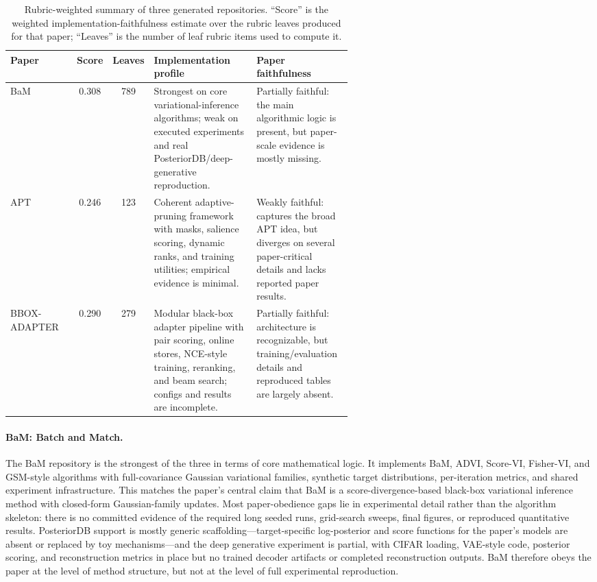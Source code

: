 \documentclass[11pt]{article}
\begin{document}
\begin{table}[t]
\centering
\small
\begin{tabular}{lcc p{0.30\linewidth} p{0.28\linewidth}}
\toprule
\textbf{Paper} & \textbf{Score} & \textbf{Leaves} &
\textbf{Implementation profile} & \textbf{Paper faithfulness} \\
\midrule
BaM & 0.308 & 789
& Strongest on core variational-inference algorithms; weak on
executed experiments and real PosteriorDB/deep-generative
reproduction.
& Partially faithful: the main algorithmic logic is present, but
paper-scale evidence is mostly missing. \\
APT & 0.246 & 123
& Coherent adaptive-pruning framework with masks, salience scoring,
dynamic ranks, and training utilities; empirical evidence is
minimal.
& Weakly faithful: captures the broad APT idea, but diverges on
several paper-critical details and lacks reported paper results. \\
BBOX-ADAPTER & 0.290 & 279
& Modular black-box adapter pipeline with pair scoring, online
stores, NCE-style training, reranking, and beam search; configs and
results are incomplete.
& Partially faithful: architecture is recognizable, but
training/evaluation details and reproduced tables are largely
absent. \\
\bottomrule
\end{tabular}
\caption{Rubric-weighted summary of three generated repositories.
``Score'' is the weighted implementation-faithfulness estimate over
the rubric leaves produced for that paper; ``Leaves'' is the number
of leaf rubric items used to compute it.}
\label{tab:three_repo_summary}
\end{table}

\paragraph{BaM: Batch and Match.} The BaM repository is the strongest
of the three in terms of core mathematical logic. It implements BaM,
ADVI, Score-VI, Fisher-VI, and GSM-style algorithms with
full-covariance Gaussian variational families, synthetic target
distributions, per-iteration metrics, and shared experiment
infrastructure. This matches the paper's central claim that BaM is a
score-divergence-based black-box variational inference method with
closed-form Gaussian-family updates. Most paper-obedience gaps lie in
experimental detail rather than the algorithm skeleton: there is no
committed evidence of the required long seeded runs, grid-search
sweeps, final figures, or reproduced quantitative results. PosteriorDB
support is mostly generic scaffolding---target-specific log-posterior
and score functions for the paper's models are absent or replaced by
toy mechanisms---and the deep generative experiment is partial, with
CIFAR loading, VAE-style code, posterior scoring, and reconstruction
metrics in place but no trained decoder artifacts or completed
reconstruction outputs. BaM therefore obeys the paper at the level of
method structure, but not at the level of full experimental
reproduction.
\end{document}
